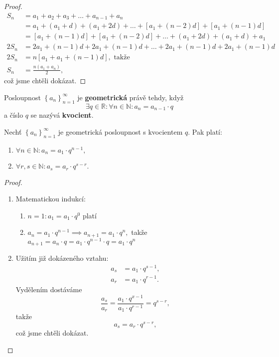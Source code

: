 \begin{proof}
\begin{align*}
    S_n &= a_1+a_2+a_3+\dots+a_{n-1}+a_n \\
    &= a_1 + (a_1+d)+ (a_1+2d)+ \dots + [a_1+(n-2)d]+[a_1+(n-1)d]\\
    &= [a_1+(n-1)d]+[a_1+(n-2)d]+\dots+(a_1+2d)+(a_1+d)+a_1\\
    2S_n &= 2a_1 + (n-1)d + 2a_1 + (n-1)d + \dots + 2a_1 + (n-1)d + 2a_1 + (n-1)d\\
    2S_n &= n [a_1 + a_1 + (n-1)d], \textrm{ takže }\\
    S_n &= \frac{n(a_1+a_n)}{2},
\end{align*}
což jsme chtěli dokázat. \qedhere
\end{proof}

\begin{definition}
Posloupnost $\left \{ a_n \right \}_{n=1}^\infty $ je \textbf{geometrická} právě
tehdy, když
$$\exists q \in \mathbb R: \forall n \in \mathbb N: a_n=a_{n-1}\cdot q$$
a číslo $q$ se nazývá \textbf{kvocient}.
\end{definition}

\begin{veta}
    Nechť $\left \{ a_n \right \}_{n=1}^\infty $ je geometrická posloupnost s kvocientem
    $q$. Pak platí:
    \begin{enumerate}[$i.$]
    \item $\forall n\in \mathbb N: a_n = a_1 \cdot q^{n-1},$
   	\item $\forall r,s \in \mathbb N: a_s = a_r \cdot q^{s-r}.$
    \end{enumerate}
\end{veta}

\begin{proof}
\begin{enumerate}[$i.$]
\item Matematickou indukcí:
\begin{enumerate}[1.]
\item $n=1: a_1 = a_1\cdot q^0$ platí
\item $a_n = a_1\cdot q^{n-1}\implies a_{n+1}=a_1\cdot q^n,$ takže $a_{n+1}=a_n\cdot q=a_1\cdot q^{n-1}\cdot q=a_1\cdot q^n$
\end{enumerate}
\item Užitím již dokázeného vztahu:
\begin{align*}
    a_s &= a_1\cdot q^{s-1},\\
    a_r &= a_1\cdot q^{r-1}.
\end{align*}
Vydělením dostáváme
$$\frac{a_s}{a_r} = \frac{a_1\cdot q^{x-1}}{a_1\cdot q^{r-1}}=q^{s-r},$$
takže
$$a_s=a_r\cdot q^{s-r},$$
což jsme chtěli dokázat.\qedhere
\end{enumerate}
\end{proof}

